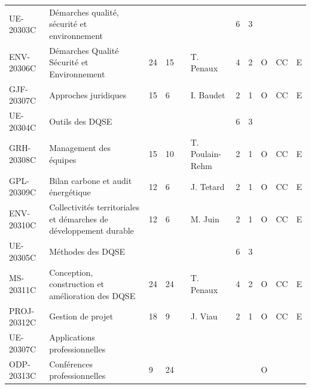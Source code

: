 \documentclass[a4paper,11pt]{article}
\begin{document}
{{\begin{tabular}{lllllllllll}
\rowcolor[HTML]{C0C0C0} 
UE-20303C     & Démarches qualité, sécurité et environnement                      &    &    &    &                 & 6    & 3    &             &                &           \\
ENV-20306C    & Démarches Qualité Sécurité et Environnement                       & 24 & 15 &    & T. Penaux       & 4    & 2    & O           & CC             & E         \\
GJF-20307C    & Approches juridiques                                              & 15 & 6  &    & I. Baudet       & 2    & 1    & O           & CC             & E         \\
UE-20304C     & Outils des DQSE                                                   &    &    &    &                 & 6    & 3    &             &                &           \\
GRH-20308C    & Management des équipes                                            & 15 & 10 &    & T. Poulain-Rehm & 2    & 1    & O           & CC             & E         \\
GPL-20309C    & Bilan carbone et audit énergétique                                & 12 & 6  &    & J. Tetard       & 2    & 1    & O           & CC             & E         \\
ENV-20310C    & Collectivités territoriales et démarches de développement durable & 12 & 6  &    & M. Juin         & 2    & 1    & O           & CC             & E         \\
\rowcolor[HTML]{C0C0C0} 
UE-20305C     & Méthodes des DQSE                                                 &    &    &    &                 & 6    & 3    &             &                &           \\
MS-20311C     & Conception, construction et amélioration des DQSE                 & 24 & 24 &    & T. Penaux       & 4    & 2    & O           & CC             & E         \\
PROJ-20312C   & Gestion de projet                                                 & 18 & 9  &    & J. Viau         & 2    & 1    & O           & CC             & E         \\
\rowcolor[HTML]{C0C0C0} 
UE-20307C     & Applications professionnelles                                     &    &    &    &                 &      &      &             &                &           \\
ODP-20313C    & Conférences professionnelles                                      & 9  & 24 &    &                 &      &      & O           &                &           \\

\end{tabular}}}
\end{document}
